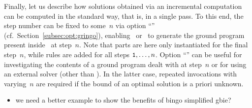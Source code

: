 Finally, let us describe how solutions obtained via an incremental computation
can be computed in the standard way, that is, in a single pass.
To this end, the step number can be fixed to some~$n$ via
option ``'' (cf.\ Section~\ref{subsec:opt:gringo}),
enabling \gringo\ or \clingo\ to generate the ground program present
inside \iclingo\ at step~$n$.
Note that  parts are here only instantiated for the final step~$n$,
while  rules are added for all steps $\texttt{1},\dots,n$.
Option ``'' can be useful for investigating the contents
of a ground program dealt with at step~$n$ or for using an external solver
(other than \clasp).
In the latter case, repeated invocations with varying~$n$
are required if the bound of an optimal solution is a priori unknown.



\begin{newstuff}
	\begin{itemize}
		\item we need a better example to show the benefits of bingo simplified gbie?
	\end{itemize}
\end{newstuff}

